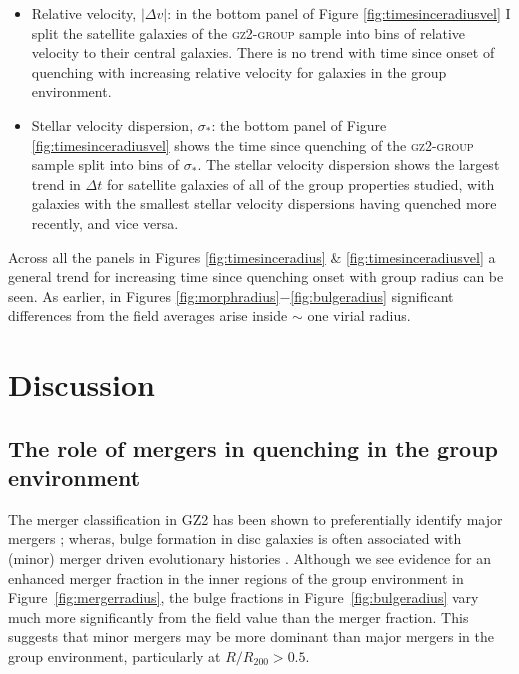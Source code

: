 \begin{itemize}
\item{Relative velocity, $|\Delta v|$: in the bottom panel of Figure \ref{fig:timesinceradiusvel} I split the satellite galaxies of the \textsc{gz2-group} sample into bins of relative velocity to their central galaxies. There is no trend with time since onset of quenching with increasing relative velocity for galaxies in the group environment.}

\item{Stellar velocity dispersion, $\sigma_*$: the bottom panel of Figure \ref{fig:timesinceradiusvel} shows the time since quenching of the \textsc{gz2-group} sample split into bins of $\sigma_*$. The stellar velocity dispersion shows the largest trend in $\Delta t$ for satellite galaxies of all of the group properties studied, with galaxies with the smallest stellar velocity dispersions having quenched more recently, and vice versa. }
\end{itemize}

Across all the panels in Figures \ref{fig:timesinceradius} \& \ref{fig:timesinceradiusvel} a general trend for increasing time since quenching onset with group radius can be seen. As earlier, in Figures \ref{fig:morphradius}$-$\ref{fig:bulgeradius} significant differences from the field averages arise inside $\sim$ one virial radius. 


\section{Discussion}\label{sec:disc}

\subsection{The role of mergers in quenching in the group environment}\label{sec:rolemergerenv}

The merger classification in GZ2 has been shown to preferentially identify major mergers \citep{darg10a}; wheras, bulge formation in disc galaxies is often associated with (minor) merger driven evolutionary histories \citep{croton06, tonini16}.  Although we see evidence for an enhanced merger fraction in the inner regions of the group environment in Figure~\ref{fig:mergerradius}, the bulge fractions in Figure~\ref{fig:bulgeradius} vary much more significantly from the field value than the merger fraction. This suggests that minor mergers may be more dominant than major mergers in the group environment, particularly at $R/R_{200} > 0.5$. 

